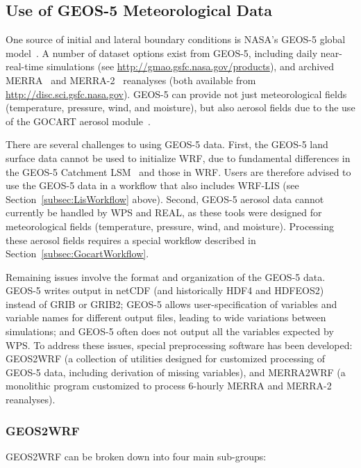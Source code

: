 \subsection{Use of GEOS-5 Meteorological Data}
\label{subsec:Geos5}

One source of initial and lateral boundary conditions is NASA's GEOS-5 
global model~\citep{ref:RieneckerEtAl2008}. A number of dataset options
exist from GEOS-5, including daily near-real-time simulations 
(see \url{http://gmao.gsfc.nasa.gov/products}), and archived 
MERRA~\citep{ref:RieneckerEtAl2011} and
MERRA-2~\citep{ref:BosilovichEtAl2015} reanalyses (both available from 
\url{http://disc.sci.gsfc.nasa.gov}).  GEOS-5 can provide not just 
meteorological fields (temperature, pressure, wind, and moisture), but also 
aerosol fields due to the use of the GOCART aerosol 
module~\citep{ref:ChinEtAl2002}.

There are several challenges to using GEOS-5 data. First, the GEOS-5 land 
surface data cannot be used to initialize WRF, due to fundamental differences
in the GEOS-5 Catchment LSM~\citep{ref:KosterEtAl2000} and those in WRF. Users
are therefore advised to use the GEOS-5 data in a workflow that also includes
WRF-LIS (see Section~\ref{subsec:LisWorkflow} above). Second, GEOS-5 aerosol
data cannot currently be handled by WPS and REAL, as these tools were designed
for meteorological fields (temperature, pressure, wind, and moisture).  
Processing these aerosol fields requires a special workflow described in
Section~\ref{subsec:GocartWorkflow}.

Remaining issues involve the format and organization of the GEOS-5 data.
GEOS-5 writes output in netCDF (and historically HDF4 and HDFEOS2) instead of 
GRIB or GRIB2; GEOS-5 allows user-specification of variables and variable
names for different output files, leading to wide variations between 
simulations; and GEOS-5 often does not output all the variables expected by 
WPS. To address these issues, special preprocessing software has 
been developed: GEOS2WRF (a collection of utilities designed for
customized processing of GEOS-5 data, including derivation of missing
variables), and MERRA2WRF (a monolithic program customized to 
process 6-hourly MERRA and MERRA-2 reanalyses). 

\subsubsection{GEOS2WRF}
\label{subsubsec:GeosWorkflow}

GEOS2WRF can be broken down into four main sub-groups:

